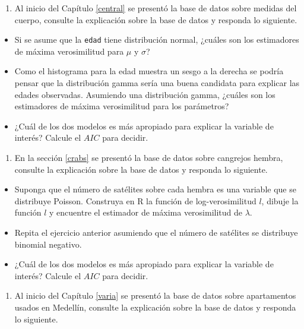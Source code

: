 \documentclass[10pt,]{krantz}
\providecommand{\tightlist}{%
  \setlength{\itemsep}{0pt}\setlength{\parskip}{0pt}}
\let\proglang=\textsf
\begin{document}
\begin{enumerate}
\def\labelenumi{\arabic{enumi})}
\tightlist
\item
  Al inicio del Capítulo \ref{central} se presentó la base de datos
  sobre medidas del cuerpo, consulte la explicación sobre la base de
  datos y responda lo siguiente.
\end{enumerate}

\begin{itemize}
\tightlist
\item
  Si se asume que la \texttt{edad} tiene distribución normal, ¿cuáles
  son los estimadores de máxima verosimilitud para \(\mu\) y \(\sigma\)?
\item
  Como el histograma para la edad muestra un sesgo a la derecha se
  podría pensar que la distribución gamma sería una buena candidata para
  explicar las edades observadas. Asumiendo una distribución gamma,
  ¿cuáles son los estimadores de máxima verosimilitud para los
  parámetros?
\item
  ¿Cuál de los dos modelos es más apropiado para explicar la variable de
  interés? Calcule el \(AIC\) para decidir.
\end{itemize}

\begin{enumerate}
\def\labelenumi{\arabic{enumi})}
\setcounter{enumi}{1}
\tightlist
\item
  En la sección \ref{crabs} se presentó la base de datos sobre cangrejos
  hembra, consulte la explicación sobre la base de datos y responda lo
  siguiente.
\end{enumerate}

\begin{itemize}
\tightlist
\item
  Suponga que el número de satélites sobre cada hembra es una variable
  que se distribuye Poisson. Construya en \proglang{R} la función de
  log-verosimilitud \(l\), dibuje la función \(l\) y encuentre el
  estimador de máxima verosimilitud de \(\lambda\).
\item
  Repita el ejercicio anterior asumiendo que el número de satélites se
  distribuye binomial negativo.
\item
  ¿Cuál de los dos modelos es más apropiado para explicar la variable de
  interés? Calcule el \(AIC\) para decidir.
\end{itemize}

\begin{enumerate}
\def\labelenumi{\arabic{enumi})}
\setcounter{enumi}{2}
\tightlist
\item
  Al inicio del Capítulo \ref{varia} se presentó la base de datos sobre
  apartamentos usados en Medellín, consulte la explicación sobre la base
  de datos y responda lo siguiente.
\end{enumerate}
\end{document}
